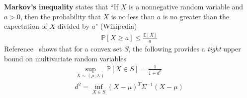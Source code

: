 \documentclass[10pt,a4paper]{article}
\begin{document}
\textbf{Markov's inequality} states that ``If $ X $ is a nonnegative random variable and $a > 0$, then the probability that $ X $ is no less than $ a $ is no greater than the expectation of $ X $ divided by $ a $" (Wikipedia)
\begin{align}
\mathbb{P}[X\ge a] \le \frac{\mathbb{E}[X]}{a}
\end{align}
Reference~\cite{OptimalIneq} shows that for a convex set $S$, the following provides a \textit{tight} upper bound on multivariate random variables 
\begin{align}
\sup_{X\sim (\mu,\Sigma)}\mathbb{P}[X\in S] = \frac{1}{1+d^2} \\
d^2 = \inf_{X\in S} (X-\mu)^T\Sigma^{-1}(X-\mu)
\end{align}
%	
%	
%	
%
\end{document}
